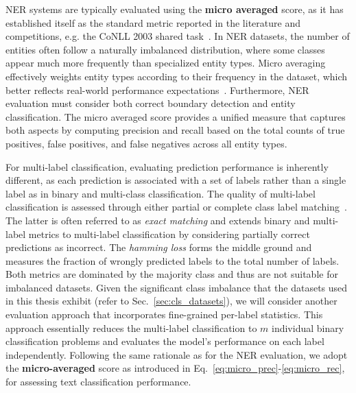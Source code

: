 NER systems are typically evaluated using the \textbf{micro averaged \ff{}}
score, as it has established itself as the standard metric reported in the
literature and competitions, e.g. the CoNLL 2003 shared
task~\cite{tjong2003introduction}. In NER datasets, the number of entities often
follow a naturally imbalanced distribution, where some classes appear much more
frequently than specialized entity types. Micro averaging effectively weights
entity types according to their frequency in the dataset, which better reflects
real-world performance expectations~\cite{harbecke2022only}. Furthermore, NER
evaluation must consider both correct boundary detection and entity
classification. The micro averaged \ff{} score provides a unified measure that
captures both aspects by computing precision and recall based on the total
counts of true positives, false positives, and false negatives across all entity
types.

For multi-label classification, evaluating prediction performance is inherently
different, as each prediction is associated with a set of labels rather than a
single label as in binary and multi-class classification. The quality of
multi-label classification is assessed through either partial or complete class
label matching~\cite{godbole2004discriminative}. The latter is often referred to
as \textit{exact matching} and extends binary and multi-label metrics to
multi-label classification by considering partially correct predictions as
incorrect. The \textit{hamming loss} forms the middle ground and measures the
fraction of wrongly predicted labels to the total number of labels. Both metrics
are dominated by the majority class and thus are not suitable for imbalanced
datasets. Given the significant class imbalance that the datasets used in this
thesis exhibit (refer to Sec.~\ref{sec:cls_datasets}), we will consider another
evaluation approach that incorporates fine-grained per-label statistics. This
approach essentially reduces the multi-label classification to $m$ individual
binary classification problems and evaluates the model's performance on each
label independently. Following the same rationale as for the NER evaluation, we
adopt the \textbf{micro-averaged \ff{}} score as introduced in
Eq.~\ref{eq:micro_prec}-\ref{eq:micro_rec}, for assessing text classification
performance. 

